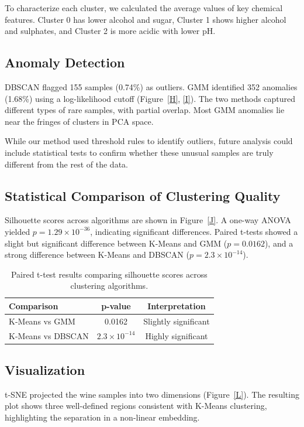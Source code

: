 \documentclass[12pt]{article}
\begin{document}
To characterize each cluster, we calculated the average values of key chemical features. Cluster 0 has lower alcohol and sugar, Cluster 1 shows higher alcohol and sulphates, and Cluster 2 is more acidic with lower pH.

\subsection*{Anomaly Detection}
DBSCAN flagged 155 samples (0.74\%) as outliers. GMM identified 352 anomalies (1.68\%) using a log-likelihood cutoff (Figure~\ref{H}, \ref{I}). The two methods captured different types of rare samples, with partial overlap. Most GMM anomalies lie near the fringes of clusters in PCA space. 

While our method used threshold rules to identify outliers, future analysis could include statistical tests to confirm whether these unusual samples are truly different from the rest of the data.

\subsection*{Statistical Comparison of Clustering Quality}
Silhouette scores across algorithms are shown in Figure~\ref{J}. A one-way ANOVA yielded $p = 1.29 \times 10^{-36}$, indicating significant differences. Paired t-tests showed a slight but significant difference between K-Means and GMM ($p = 0.0162$), and a strong difference between K-Means and DBSCAN ($p = 2.3 \times 10^{-14}$).

\begin{table}[H]
\centering
\begin{tabular}{lcc}
\toprule
\textbf{Comparison} & \textbf{p-value} & \textbf{Interpretation} \\
\midrule
K-Means vs GMM     & 0.0162           & Slightly significant \\
K-Means vs DBSCAN  & $2.3 \times 10^{-14}$ & Highly significant \\
\bottomrule
\end{tabular}
\caption{Paired t-test results comparing silhouette scores across clustering algorithms.}
\label{K}
\end{table}

\subsection*{Visualization}
t-SNE projected the wine samples into two dimensions (Figure~\ref{L}). The resulting plot shows three well-defined regions consistent with K-Means clustering, highlighting the separation in a non-linear embedding.
\end{document}
